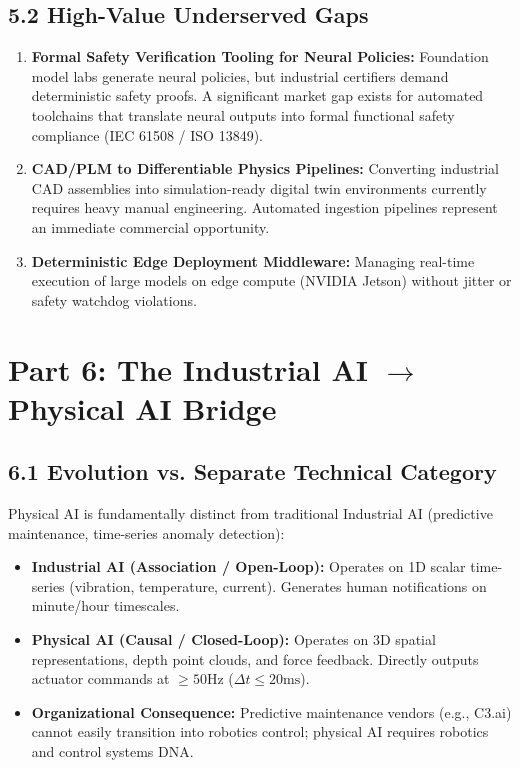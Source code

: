 \documentclass[11pt,a4paper]{article}
\begin{document}
\subsection{5.2 High-Value Underserved Gaps}
\begin{enumerate}
    \item \textbf{Formal Safety Verification Tooling for Neural Policies:} Foundation model labs generate neural policies, but industrial certifiers demand deterministic safety proofs. A significant market gap exists for automated toolchains that translate neural outputs into formal functional safety compliance (IEC 61508 / ISO 13849).
    \item \textbf{CAD/PLM to Differentiable Physics Pipelines:} Converting industrial CAD assemblies into simulation-ready digital twin environments currently requires heavy manual engineering. Automated ingestion pipelines represent an immediate commercial opportunity.
    \item \textbf{Deterministic Edge Deployment Middleware:} Managing real-time execution of large models on edge compute (NVIDIA Jetson) without jitter or safety watchdog violations.
\end{enumerate}

\section{Part 6: The Industrial AI \texorpdfstring{$\rightarrow$}{to} Physical AI Bridge}

\subsection{6.1 Evolution vs. Separate Technical Category}
Physical AI is fundamentally distinct from traditional Industrial AI (predictive maintenance, time-series anomaly detection):
\begin{itemize}
    \item \textbf{Industrial AI (Association / Open-Loop):} Operates on 1D scalar time-series (vibration, temperature, current). Generates human notifications on minute/hour timescales.
    \item \textbf{Physical AI (Causal / Closed-Loop):} Operates on 3D spatial representations, depth point clouds, and force feedback. Directly outputs actuator commands at $\ge 50\text{Hz}$ ($\Delta t \le 20\text{ms}$).
    \item \textbf{Organizational Consequence:} Predictive maintenance vendors (e.g., C3.ai) cannot easily transition into robotics control; physical AI requires robotics and control systems DNA.
\end{itemize}
\end{document}
